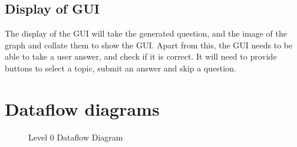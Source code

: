 \subsection{Display of GUI}
The display of the GUI will take the generated question, and the image of the graph and collate them to show the GUI. Apart from this, the GUI needs to be able to take a user answer, and check if it is correct. It will need to provide buttons to select a topic, submit an answer and skip a question.
\section{Dataflow diagrams}
\begin{figure}[H]
\centering
{}
\caption{Level 0 Dataflow Diagram}
\end{figure}
